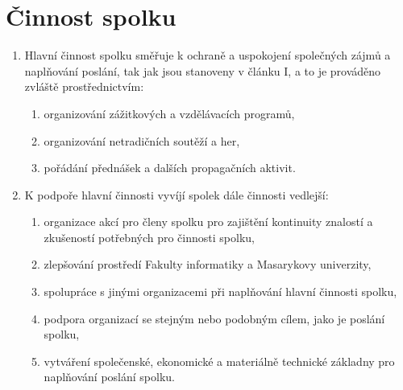\documentclass[11pt]{article}
\begin{document}
\section{Činnost spolku}
\begin{enumerate}
\item Hlavní činnost spolku směřuje k ochraně a uspokojení společných zájmů a naplňování poslání, tak jak jsou stanoveny v článku I, a to je prováděno zvláště prostřednictvím: 
\begin{enumerate}
\item organizování zážitkových a vzdělávacích programů,
\item organizování netradičních soutěží a her,
\item pořádání přednášek a dalších propagačních aktivit.
\end{enumerate}
\item K podpoře hlavní činnosti vyvíjí spolek dále činnosti vedlejší: 
\begin{enumerate}
\item organizace akcí pro členy spolku pro zajištění kontinuity znalostí a zkušeností potřebných pro činnosti spolku,
\item zlepšování prostředí Fakulty informatiky a Masarykovy univerzity,
\item spolupráce s jinými organizacemi při naplňování hlavní činnosti spolku,
\item podpora organizací se stejným nebo podobným cílem, jako je poslání spolku,
\item vytváření společenské, ekonomické a materiálně technické základny pro naplňování poslání spolku.
\end{enumerate}
\end{enumerate}
\end{document}
